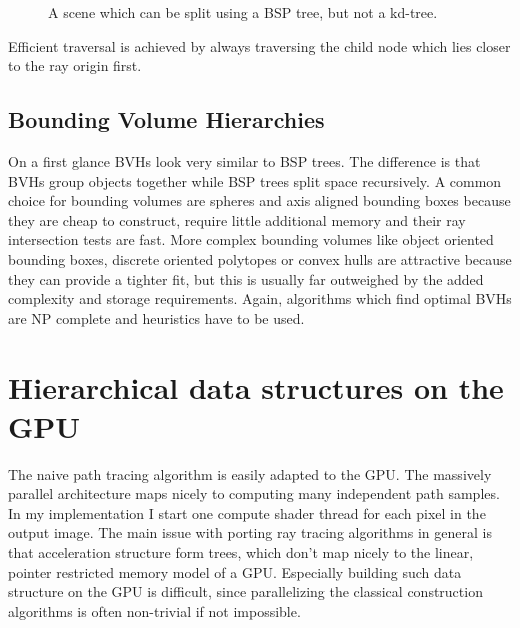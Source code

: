 \documentclass{ACGSeminar}
\begin{document}
\begin{figure}[htb!]
  \centering
  
  \caption{A scene which can be split using a BSP tree, but not a kd-tree.}
  \label{fig:bsp-trees}
\end{figure}

Efficient traversal is achieved by always traversing the child node which lies closer to the ray origin first.

\subsection{Bounding Volume Hierarchies}
On a first glance BVHs look very similar to BSP trees. The difference is that BVHs group objects together while BSP trees split space recursively. A common choice for bounding volumes are spheres and axis aligned bounding boxes because they are cheap to construct, require little additional memory and their ray intersection tests are fast. More complex bounding volumes like object oriented bounding boxes, discrete oriented polytopes or convex hulls are attractive because they can provide a tighter fit, but this is usually far outweighed by the added complexity and storage requirements.
Again, algorithms which find optimal BVHs are NP complete and heuristics have to be used.


\section{Hierarchical data structures on the GPU} \label{gpu-adapting}
The naive path tracing algorithm is easily adapted to the GPU. The massively parallel architecture maps nicely to computing many independent path samples. In my implementation I start one compute shader thread for each pixel in the output image. The main issue with porting ray tracing algorithms in general is that acceleration structure form trees, which don't map nicely to the linear, pointer restricted memory model of a GPU. Especially building such data structure on the GPU is difficult, since parallelizing the classical construction algorithms is often non-trivial if not impossible. \cite[1]{Karras:2012:MPC:2383795.2383801}
\end{document}
